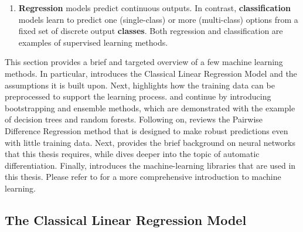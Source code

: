 \begin{enumerate}
    \item \textbf{Regression} models predict continuous outputs. In contrast, \textbf{classification} models learn to predict one (single-class) or more (multi-class) options from a fixed set of discrete output \textbf{classes}. Both regression and classification are examples of supervised learning methods.
\end{enumerate}

\noindent This section provides a brief and targeted overview of a few machine learning methods. In particular,  introduces the Classical Linear Regression Model and the assumptions it is built upon. Next,  highlights how the training data can be preprocessed to support the learning process.  and  continue by introducing bootstrapping and ensemble methods, which are demonstrated with the example of decision trees and random forests. Following on,  reviews the Pairwise Difference Regression method that is designed to make robust predictions even with little training data. Next,  provides the brief background on neural networks that this thesis requires, while  dives deeper into the topic of automatic differentiation. Finally,  introduces the machine-learning libraries that are used in this thesis. Please refer to \textcite{machine-learning-1997} for a more comprehensive introduction to machine learning.

\subsection{The Classical Linear Regression Model} \label{txt:linear-model}

